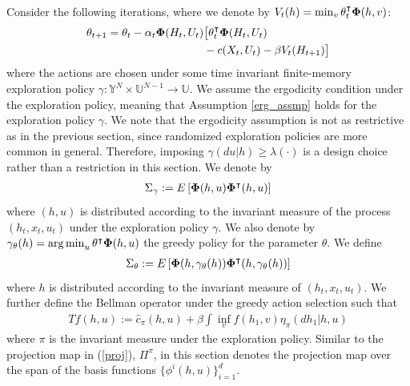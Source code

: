 \documentclass[letterpaper, 10 pt, conference]{ieeeconf}  %
\def\argmin{\mathop{\rm arg\, min}}
\theoremstyle{definition}
\theoremstyle{remark}
\begin{document}
 Consider the following iterations, where we denote by $V_t(h)=\min_v \theta_t^\intercal {\bf \Phi}(h,v)$:
\begin{align}\label{opt_iter}
\theta_{t+1}= \theta_t - \alpha_t {\bf \Phi}(H_t,U_t) &\big[\theta_t^\intercal {\bf \Phi}(H_t,U_t) \nonumber\\
&- c(X_t,U_t) - \beta V_t(H_{t+1}) \big]
\end{align}
where the actions are chosen under some time invariant finite-memory exploration policy $\gamma:\mathds{Y}^N\times\mathds{U}^{N-1}\to\mathds{U}$.
We assume the ergodicity condition under the exploration policy, meaning that Assumption \ref{erg_assmp} holds for the exploration policy $\gamma$.
We note that the ergodicity assumption is not as restrictive as in the previous section, since randomized exploration policies are more common in general. Therefore, imposing $\gamma(du|h)\geq \lambda(\cdot)$ is a design choice rather than a restriction in this section.
We denote by
\begin{align}\label{sigma_gamma}
\Sigma_\gamma:=E\left[{\bf \Phi}(h,u){\bf \Phi}^\intercal(h,u)\right]
\end{align}
where $(h,u)$ is distributed according  to the invariant measure of the process $(h_t,x_t,u_t)$ under the exploration policy $\gamma$. We also denote by $\gamma_\theta(h)=\argmin_u \theta^\intercal {\bf \Phi}(h,u) $ the greedy policy for the parameter $\theta$. We define
\begin{align}\label{sigma_star}
\Sigma_\theta:=E\left[{\bf \Phi}(h,\gamma_\theta(h)){\bf \Phi}^\intercal(h,\gamma_\theta(h))\right]
\end{align}
where $h$ is distributed according to the invariant measure of $(h_t,x_t,u_t)$.
We further define the Bellman operator under the greedy action selection such that 
\begin{align}\label{greedy_bell}
T f(h,u) := \hat{c}_\pi(h,u) + \beta \int \inf_vf(h_1,v)\eta_\pi(dh_1|h,u)
\end{align}
where $\pi$ is the invariant measure under the exploration policy. Similar to the projection map in (\ref{proj}), $\Pi^\pi$, in this section denotes the projection map over the span of the basis functions $\{\phi^i(h,u)\}_{i=1}^d$.
\end{document}
